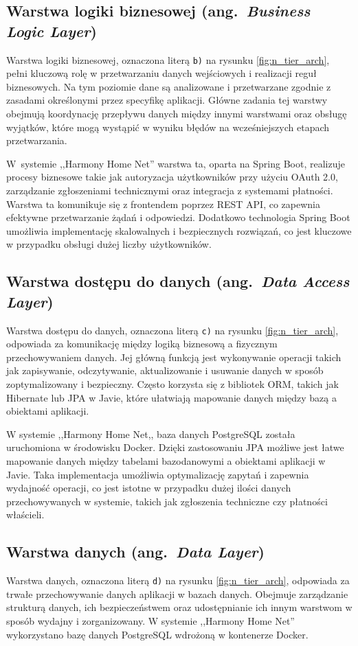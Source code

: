 \subsection{Warstwa logiki biznesowej (ang.\ \emph{Business Logic Layer})}

Warstwa logiki biznesowej, oznaczona  literą \texttt{b)} na rysunku \ref{fig:n_tier_arch}, pełni kluczową rolę w przetwarzaniu danych wejściowych i realizacji reguł biznesowych. Na tym poziomie dane są analizowane i przetwarzane zgodnie z zasadami określonymi przez specyfikę aplikacji. Główne zadania tej warstwy obejmują koordynację przepływu danych między innymi warstwami oraz obsługę wyjątków, które mogą wystąpić w wyniku błędów na wcześniejszych etapach przetwarzania.

W~systemie ,,Harmony Home Net'' warstwa ta, oparta na Spring Boot, realizuje procesy biznesowe takie jak autoryzacja użytkowników przy użyciu OAuth 2.0, zarządzanie zgłoszeniami technicznymi oraz integracja z systemami płatności. Warstwa ta komunikuje się z frontendem poprzez REST API, co zapewnia efektywne przetwarzanie żądań i odpowiedzi. Dodatkowo technologia Spring Boot umożliwia implementację skalowalnych i bezpiecznych rozwiązań, co jest kluczowe w przypadku obsługi dużej liczby użytkowników.

\subsection{Warstwa dostępu do danych (ang.\ \emph{Data Access Layer})}

Warstwa dostępu do danych, oznaczona literą \texttt{c)} na rysunku \ref{fig:n_tier_arch}, odpowiada za komunikację między logiką biznesową a fizycznym przechowywaniem danych. Jej główną funkcją jest wykonywanie operacji takich jak zapisywanie, odczytywanie, aktualizowanie i usuwanie danych w sposób zoptymalizowany i bezpieczny. Często korzysta się z bibliotek ORM, takich jak Hibernate lub JPA w Javie, które ułatwiają mapowanie danych między bazą a obiektami aplikacji.

W systemie ,,Harmony Home Net,, baza danych PostgreSQL została uruchomiona w środowisku Docker. Dzięki zastosowaniu JPA możliwe jest łatwe mapowanie danych między tabelami bazodanowymi a obiektami aplikacji w Javie. Taka implementacja umożliwia optymalizację zapytań i zapewnia wydajność operacji, co jest istotne w przypadku dużej ilości danych przechowywanych w systemie, takich jak zgłoszenia techniczne czy płatności właścieli.

\subsection{Warstwa danych (ang.\ \emph{Data Layer})}
Warstwa danych, oznaczona literą \texttt{d)} na rysunku \ref{fig:n_tier_arch}, odpowiada za trwałe przechowywanie danych aplikacji w bazach danych. Obejmuje zarządzanie strukturą danych, ich bezpieczeństwem oraz udostępnianie ich innym warstwom w sposób wydajny i zorganizowany. W systemie ,,Harmony Home Net'' wykorzystano bazę danych PostgreSQL wdrożoną w kontenerze Docker. 

